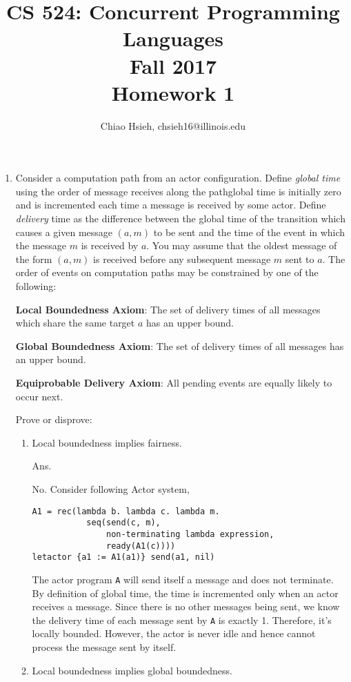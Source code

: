 \documentclass{article}
\title{\Large\bfseries
CS 524: Concurrent Programming Languages \\
Fall 2017 \\
Homework 1}
\author{Chiao Hsieh, chsieh16@illinois.edu}
\begin{document}
\maketitle

\begin{enumerate}
\item Consider a computation path from an actor configuration.
Define \textit{global time} using the order of message receives along the
path\textemdash global time is initially zero and is incremented each time a
message is received by some actor.
Define \textit{delivery} time as the difference between the global time of the
transition which causes a given message $(a, m)$ to be sent and the time of
the event in which the message $m$ is received by $a$.
You may assume that the oldest message of the form $(a, m)$ is received before
any subsequent message $m$ sent to $a$.
The order of events on computation paths may be constrained by one of the
following:

\textbf{Local Boundedness Axiom}:
The set of delivery times of all messages which share the same target $a$ has
an upper bound.

\textbf{Global Boundedness Axiom}:
The set of delivery times of all messages has an upper bound.

\textbf{Equiprobable Delivery Axiom}:
All pending events are equally likely to occur next.

Prove or disprove:
\begin{enumerate}
\item Local boundedness implies fairness.

Ans.

No. Consider following Actor system,
\begin{verbatim}
A1 = rec(lambda b. lambda c. lambda m.
           seq(send(c, m),
               non-terminating lambda expression,
               ready(A1(c))))
letactor {a1 := A1(a1)} send(a1, nil)
\end{verbatim}
The actor program \texttt{A} will send itself a message and does not
terminate. By definition of global time, the time is incremented only when an
actor receives a message. Since there is no other messages being sent, we
know the delivery time of each message sent by \texttt{A} is exactly 1.
Therefore, it's locally bounded. However, the actor is never idle and hence
cannot process the message sent by itself.

\item Local boundedness implies global boundedness.


\end{enumerate}
\end{enumerate}
\end{document}
